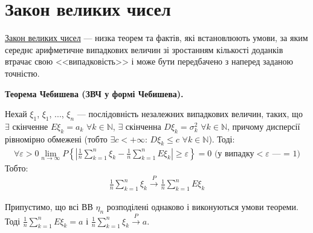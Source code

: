 \section{Закон великих чисел}
\noindent\underline{Закон великих чисел} --- низка теорем та фактів, які встановлюють умови, 
за яким середнє арифметичне випадкових величин зі зростанням кількості доданків втрачає 
свою <<випадковість>> і може бути передбачено з наперед заданою точністю.


\noindent\textbf{Теорема Чебишева (ЗВЧ у формі Чебишева).}

\begin{theorem}
    Нехай $\xi_1$, $\xi_1$, ..., $\xi_n$ --- послідовність незалежних випадкових величин, 
    таких, що $\exists$ скінченне $E\xi_k = a_k$ $\forall k \in \mathbb{N}$, $\exists$
    скінченна $D\xi_k = \sigma_k^2$ $\forall k \in \mathbb{N}$, причому дисперсії рівномірно 
    обмежені (тобто $\exists c < +\infty$: $D\xi_k \leq c$ $\forall k \in \mathbb{N}$). 
    Тоді:
    \begin{gather}
        \forall \varepsilon > 0 \lim_{n \rightarrow \infty} P\left\{\left|
            \frac{1}{n}\sum\limits_{k=1}^n \xi_k - \frac{1}{n}\sum\limits_{k=1}^n E\xi_k 
        \right| \geq \varepsilon\right\} = 0 \text{ (у випадку} < \varepsilon\text{ --- = 1)}
    \end{gather}
    Тобто:
    \begin{gather}
        \frac{1}{n}\sum\limits_{k=1}^n \xi_k \overset{P}{\rightarrow}  \frac{1}{n}\sum\limits_{k=1}^n E\xi_k
    \end{gather}
\end{theorem}
\begin{remark}
    Припустимо, що всі ВВ $\eta_n$ розподілені однаково і виконуються умови теореми. Тоді 
    $\frac{1}{n}\sum\limits_{k=1}^n E\xi_k = a$ і $\frac{1}{n}\sum\limits_{k=1}^n \xi_k 
    \overset{P}{\rightarrow} a$. 
\end{remark}